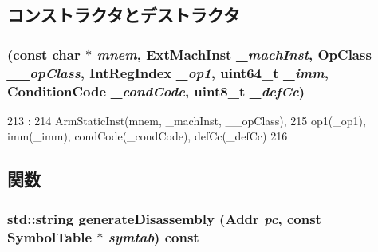 \subsection{コンストラクタとデストラクタ}
\hypertarget{classArmISA_1_1DataXCondCompImmOp_a641451cf942deeb1fd1275bccf8ed843}{
\subsubsection[{DataXCondCompImmOp}]{ (const char $\ast$ {\em mnem}, \/  {\bf ExtMachInst} {\em \_\-machInst}, \/  OpClass {\em \_\-\_\-opClass}, \/  {\bf IntRegIndex} {\em \_\-op1}, \/  uint64\_\-t {\em \_\-imm}, \/  {\bf ConditionCode} {\em \_\-condCode}, \/  uint8\_\-t {\em \_\-defCc})}}
\label{classArmISA_1_1DataXCondCompImmOp_a641451cf942deeb1fd1275bccf8ed843}



\begin{DoxyCode}
213                                                                :
214         ArmStaticInst(mnem, _machInst, __opClass),
215         op1(_op1), imm(_imm), condCode(_condCode), defCc(_defCc)
216     {}

\end{DoxyCode}


\subsection{関数}
\hypertarget{classArmISA_1_1DataXCondCompImmOp_a95d323a22a5f07e14d6b4c9385a91896}{
\subsubsection[{generateDisassembly}]{\setlength{\rightskip}{0pt plus 5cm}std::string generateDisassembly ({\bf Addr} {\em pc}, \/  const SymbolTable $\ast$ {\em symtab}) const}}
\label{classArmISA_1_1DataXCondCompImmOp_a95d323a22a5f07e14d6b4c9385a91896}


